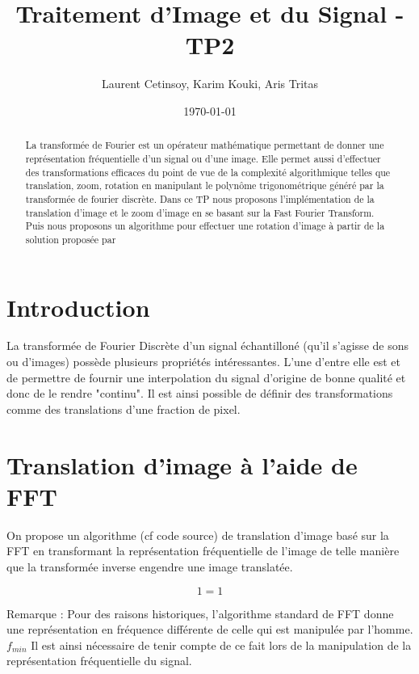 \documentclass[12pt]{article}
\title{Traitement d'Image et du Signal - TP2}
\author{Laurent Cetinsoy, Karim Kouki, Aris Tritas }
\date{\today}
\begin{document}
\maketitle

\begin{abstract}
La transformée de Fourier est un opérateur mathématique permettant de donner une représentation fréquentielle d'un signal ou d'une image. 
Elle permet aussi d'effectuer des transformations efficaces du point de vue de la complexité algorithmique telles que translation, zoom, rotation 
en manipulant le polynôme trigonométrique généré par la transformée de fourier discrète. Dans ce TP nous proposons l'implémentation de la translation d'image et le zoom d'image en se basant sur la Fast Fourier Transform. Puis nous proposons un algorithme pour effectuer une rotation d'image à partir de la solution proposée par 
\end{abstract}

\section{Introduction}

La transformée de Fourier Discrète d'un signal échantilloné (qu'il s'agisse de sons ou d'images) possède plusieurs propriétés intéressantes. L'une d'entre elle est et de permettre de fournir une interpolation du signal d'origine de bonne qualité et donc de le rendre "continu". Il est ainsi possible de définir des transformations comme des translations d'une fraction de pixel.

\section{Translation d'image à l'aide de FFT}

On propose un algorithme (cf code source) de translation d'image basé sur la FFT en transformant la représentation fréquentielle de l'image de telle manière que la transformée inverse engendre une image translatée. 

\begin{equation*}
1 = 1
\end{equation*}

Remarque : Pour des raisons historiques, l'algorithme standard de FFT donne une représentation en fréquence différente de celle qui est manipulée par l'homme. $f_{min}$ Il est ainsi nécessaire de tenir compte de ce fait lors de la manipulation de la représentation fréquentielle du signal.
\end{document}
